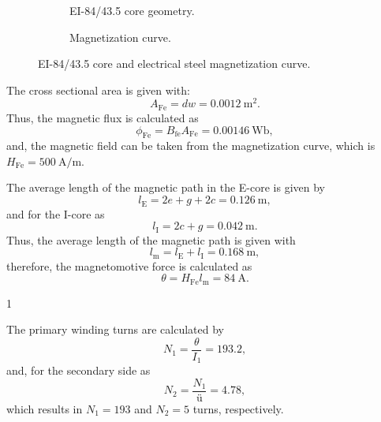 \begin{figure}[htb]
	\begin{subfigure}{.49\textwidth}
		\centering
		
		\caption{EI-84/43.5 core geometry.}
		\label{fig:EI_core_sketch}
	\end{subfigure}
	\begin{subfigure}{.49\textwidth}
		\centering
		
		\caption{Magnetization curve.}
		\label{fig:magnetization_curve}
	\end{subfigure}
	\caption{EI-84/43.5 core and electrical steel magnetization curve.}
	\label{fig:EI_core}
\end{figure}

\begin{solutionblock}
	The cross sectional area is given with:
	$$ A_\mathrm{Fe} = d  w = \SI{0.0012}{\metre^2}. $$
	Thus, the magnetic flux is calculated as
	$$ \phi_\mathrm{Fe} = B_\mathrm{fe} A_\mathrm{Fe} = \SI{0.00146}{\weber}, $$
	and, the magnetic field can be taken from the magnetization curve, which is $H_\mathrm{Fe} = \SI{500}{\ampere\per\metre}$.

	The average length of the magnetic path in the E-core is given by
	$$ l_\mathrm{E} =  2 e + g + 2c = \SI{0.126}{\metre},$$
	and for the I-core as
	$$ l_\mathrm{I} = 2c +g = \SI{0.042}{\metre}.$$
	Thus, the average length of the magnetic path is given with
	$$ l_\mathrm{m} = l_\mathrm{E} + l_\mathrm{I} = \SI{0.168}{\metre}, $$
	therefore, the magnetomotive force is calculated as
	$$ \theta = H_\mathrm{Fe} l_\mathrm{m} = \SI{84}{\ampere}.$$

\end{solutionblock}

 {1}


\begin{solutionblock}
	The primary winding turns are calculated by
	$$ N_\mathrm{1} = \frac{\theta}{I_\mathrm{1}}  = 193.2, $$
	and, for the secondary side as
	$$ N_\mathrm{2} = \frac{N_\mathrm{1}}{ü} = 4.78,$$
	which results in $N_\mathrm{1} = 193$ and $N_\mathrm{2} = 5$ turns, respectively.
\end{solutionblock}


